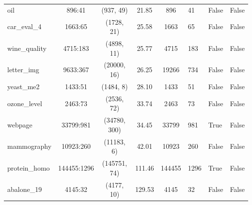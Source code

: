\begin{tabular}{lcccc}
oil & 896:41 & (937, 49) & 21.85 & 896 & 41 & False & False \\
car_eval_4 & 1663:65 & (1728, 21) & 25.58 & 1663 & 65 & False & False \\
wine_quality & 4715:183 & (4898, 11) & 25.77 & 4715 & 183 & False & False \\
letter_img & 9633:367 & (20000, 16) & 26.25 & 19266 & 734 & False & False \\
yeast_me2 & 1433:51 & (1484, 8) & 28.10 & 1433 & 51 & False & False \\
ozone_level & 2463:73 & (2536, 72) & 33.74 & 2463 & 73 & False & False \\
webpage & 33799:981 & (34780, 300) & 34.45 & 33799 & 981 & True & False \\
mammography & 10923:260 & (11183, 6) & 42.01 & 10923 & 260 & False & False \\
protein_homo & 144455:1296 & (145751, 74) & 111.46 & 144455 & 1296 & True & False \\
abalone_19 & 4145:32 & (4177, 10) & 129.53 & 4145 & 32 & False & False \\
\bottomrule
\end{tabular}

